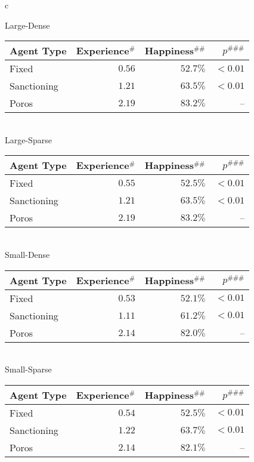 \documentclass[11pt,          %
               phd,           %
               onehalfspacing %
               ]{ncsuthesis}
\newcommand{\frameworkB}{Poros\xspace}
\begin{document}
\begin{table*}[!htb]
\caption{Empirical results on the effectiveness of \frameworkB agents.}
\label{tab:experiment1-results}
\centering

\begin{tabular}{c}

Large-Dense 
\\

\begin{tabular}{lrrr}
\toprule
Agent Type & Experience$^\#$ & Happiness$^{\#\#}$ & $p^{\#\#\#}$\\
\midrule
Fixed & $0.56$ &$52.7\%$ & $< 0.01$\\
Sanctioning & $1.21$ &$63.5\%$ & $< 0.01$\\
\frameworkB & $2.19$&$83.2\%$ & -- \\
\bottomrule
\end{tabular}
\vspace{1em}
\\
Large-Sparse
\\
\begin{tabular}{lrrr}
\toprule
Agent Type & Experience$^\#$ & Happiness$^{\#\#}$ & $p^{\#\#\#}$\\
\midrule
Fixed &$0.55$  &$52.5\%$ & $< 0.01$\\
Sanctioning &$1.21$  &$63.5\%$ & $< 0.01$\\
\frameworkB &$2.19$ &$83.2\%$ & --\\
\bottomrule
\end{tabular}
\vspace{1em}
\\
Small-Dense 
\\
\begin{tabular}{lrrr}
\toprule
Agent Type & Experience$^\#$ & Happiness$^{\#\#}$ & $p^{\#\#\#}$\\
\midrule
Fixed &$0.53$  &$52.1\%$ & $< 0.01$\\
Sanctioning &$1.11$  &$61.2\%$ & $< 0.01$\\
\frameworkB &$2.14$ &$82.0\%$ & --\\
\bottomrule
\end{tabular}
\vspace{1em}
\\
Small-Sparse
\\
\begin{tabular}{lrrr}
\toprule
Agent Type & Experience$^\#$ & Happiness$^{\#\#}$ & $p^{\#\#\#}$\\
\midrule
Fixed &$0.54$  &$52.5\%$ & $< 0.01$\\
Sanctioning &$1.22$  &$63.7\%$ & $< 0.01$\\
\frameworkB &$2.14$ &$82.1\%$ & --\\
\bottomrule
\end{tabular}
\vspace{1em}
\\


\end{tabular}
\end{table*}
\end{document}
